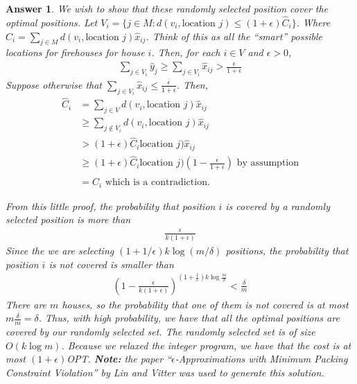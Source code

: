 \documentclass[12pt]{article}
\theoremstyle{colon}
\newtheorem*{answer}{Answer}
\begin{document}
\begin{answer}
  We wish to show that these randomly selected position cover the optimal positions. Let $V_i = \{ j \in M: d(v_i, \text{location } j) \leq (1+\epsilon) \hat{C}_i\}$. Where $\hat{C}_i = \sum_{j \in M} d(v_i, \text{location } j) \hat{x}_{ij}$. Think of this as all the ``smart'' possible locations for firehouses for house $i$. Then, for each $i \in V$ and $\epsilon > 0$,
  \begin{gather*}
    \sum_{j \in V_i} \hat{y}_j \geq \sum_{j \in V_i} \hat{x}_{ij} > \frac{\epsilon}{1+\epsilon}
  \end{gather*}
  Suppose otherwise that $\sum_{j \in V_i} \hat{x}_{ij} \leq \frac{\epsilon}{1+\epsilon}$. Then,
  \begin{align*}
    \hat{C}_i &= \sum_{j \in V} d(v_i, \text{location } j) \hat{x}_{ij} \\
    &\geq \sum_{j \notin V_i} d(v_i, \text{location } j) \hat{x}_{ij} \\
    &> (1 + \epsilon) \hat{C}_i \text{location } j) \hat{x}_{ij} \\
    &\geq (1 + \epsilon) \hat{C}_i \text{location } j) \left( 1 - \frac{\epsilon}{1+\epsilon} \right) \text{ by assumption} \\
    &= \hat{C}_i \text{ which is a contradiction.}
  \end{align*}

  From this little proof, the probability that position $i$ is covered by a randomly selected position is more than
  \begin{gather*}
    \frac{\epsilon}{k(1+\epsilon)}
  \end{gather*}
  Since the we are selecting $(1+1/\epsilon) k \log{(m/\delta)}$ positions, the probability that position $i$ is not covered is smaller than
  \begin{gather*}
    \left( 1 - \frac{\epsilon}{k(1+\epsilon)} \right)^{(1+\frac{1}{\epsilon})k \log \frac{m}{\delta}} < \frac{\delta}{m}
  \end{gather*}
  There are $m$ houses, so the probability that one of them is not covered is at most $m \frac{\delta}{m} = \delta$. Thus, with high probability, we have that all the optimal positions are covered by our randomly selected set. The randomly selected set is of size $O(k \log m)$. Because we relaxed the integer program, we have that the cost is at most $(1+\epsilon)$OPT. \textbf{Note:} the paper ``$\epsilon$-Approximations with Minimum Packing Constraint Violation'' by Lin and Vitter was used to generate this solution.
\end{answer}
\end{document}
